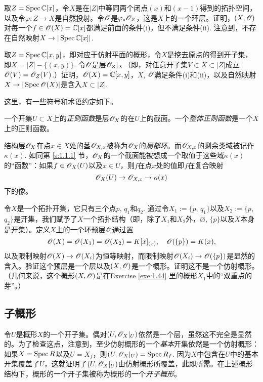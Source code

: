 \begin{exe}
\begin{compactenum}[(a)]
\item 取$Z=\operatorname{Spec} \mathbb{C}[x]$，令$X$是在$|Z|$中等同两个闭点$(x)$和$(x-1)$得到的拓扑空间，以及令$\varphi:Z\to X$是自然投射。令$\mathscr{O}$是$\varphi_* \mathscr{O}_Z$，这是$X$上的一个环层。证明，$(X,\mathscr{O})$对每一个$f\in\mathscr{O}(X)=\mathbb{C}[x]$都满足前面的条件(i)，但不满足条件(ii). 注意到，不存在自然映射$X\to |\operatorname{Spec}\mathbb{C}[x]|$.
\item 取$Z=\operatorname{Spec} \mathbb{C}[x,y]$，即对应于仿射平面的概形，令$X$是挖去原点的得到开子集，即$X=|Z|-\{(x,y)\}$. 令$\mathscr{O}$是层$\mathscr{O}_Z|_X$（即，对任意开子集$V\subset X\subset |Z|$成立$\mathscr{O}(V)=\mathscr{O}_Z(V)$.）证明，$\mathscr{O}(X)=\mathbb{C}[x,y]$，$X$, $\mathscr{O}$满足条件(i)和(ii)，以及自然映射$X\to |\operatorname{Spec}\mathscr{O}(X)|$是含入$X\subset |Z|$.
\end{compactenum}
\end{exe}

这里，有一些符号和术语约定如下。

一个开集$U\subset X$上的\textit{正则函数}是层$\mathscr{O}_X$的在$U$上的截面。一个\textit{整体正则函数}是一个$X$上的正则函数。

结构层$\mathscr{O}_X$在点$x\in X$处的茎$\mathscr{O}_{X,x}$被称为$\mathscr{O}_X$的\textit{局部环}。而$\mathscr{O}_{X,x}$的剩余类域被记作$\kappa(x)$. 如同第 \ref{s:1.1.1} 节，$\mathscr{O}_X$的一个截面能被想成一个取值于这些域$\kappa(x)$的“函数”：如果$f\in\mathscr{O}_X(U)$以及$x\in U$，则$f$在点$x$处的值即$f$在复合映射
\[
	\mathscr{O}_X(U)\to \mathscr{O}_{X,x}\to \kappa(x)
\]
下的像。

\begin{exe}[最小的非仿射概形]
令$X$是一个拓扑开集，它只有三个点$p$, $q_1$和$q_2$. 通过令$X_1:=\{p$, $q_1\}$以及$X_2:=\{p$, $q_2\}$是开集，我们赋予了$X$一个拓扑结构（即，除了$X_1$和$X_2$外，$\varnothing$, $\{p\}$以及$X$本身是开集）。定义$X$上的一个环预层$\mathscr{O}$通过置
\[
	\mathscr{O}(X)=\mathscr{O}(X_1)=\mathscr{O}(X_2)=K[x]_{(x)},\quad \mathscr{O}(\{p\})=K(x),
\]
以及限制映射$\mathscr{O}(X)\to \mathscr{O}(X_i)$为恒等映射，而限制映射$\mathscr{O}(X_i)\to \mathscr{O}(\{p\})$是显然的含入。验证这个预层是一个层以及$(X,\mathscr{O})$是一个概形。证明这不是一个仿射概形。（几何来说，这个概形$(X,\mathscr{O})$是在Exercise \ref{exe:1.44} 里的概形$X_1$中的“双重点的芽”。）
\end{exe}

\subsection{子概形}\label{s:1.2.1}

令$U$是概形$X$的一个开子集。偶对$(U,\mathscr{O}_X|_U)$依然是一个层，虽然这不完全是显然的。为了检查这点，注意到，至少仿射概形的一个\textit{基本}开集依然是一个仿射概形：如果$X=\operatorname{Spec} R$以及$U=X_f$，则$(U,\mathscr{O}_X|_U)=\operatorname{Spec} R_f$. 因为$X$中包含在$U$中的基本开集覆盖了$U$，这就证明了$(U,\mathscr{O}_X|_U)$由仿射概形所覆盖，此即所需。在上述概形结构下，概形的一个开子集被称为概形的一个\textit{开子概形}。

